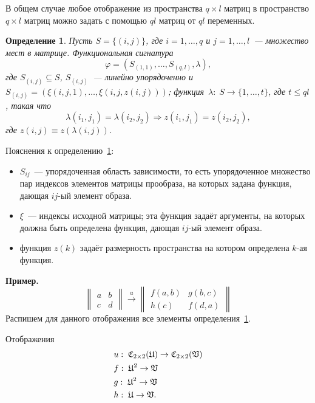 \documentclass[a4paper, 12pt]{report}
\newtheorem{definition}{Определение}[chapter]
\begin{document}
В общем случае любое отображение из пространства $q\times l$ матриц в пространство $q\times l$ матриц можно задать с помощью $ql$ матриц от $ql$ переменных.

\begin{definition}
\label{def::sign}
Пусть $S = \{ (i, j) \}$, где $i = 1,\ldots, q$ и $j = 1,\ldots, l$~--- множество мест в матрице. Функциональная сигнатура
\[
\varphi = (S_{(1,1)}, \ldots, S_{(q, l)}, \lambda),
\]
где $S_{(i, j)} \subseteq S$, $S_{(i,j)}$~--- линейно упорядоченно и $S_{(i,j)} = (\xi(i, j, 1), \ldots, \xi(i, j, z(i, j)))$; функция~$\lambda: \;S \rightarrow \{1, \ldots, t\}$, где $t \leq ql$, такая что
\[
\lambda(i_1, j_1) = \lambda(i_2, j_2) \Rightarrow z(i_1, j_1) = z(i_2, j_2),
\]
где $z(i, j) \equiv z(\lambda(i, j))$.
\end{definition}
Пояснения к определению~\ref{def::sign}:
\begin{itemize}
\item $S_{ij}$~--- упорядоченная область зависимости, то есть упорядоченное множество пар индексов элементов матрицы прообраза, на которых задана функция, дающая $ij$-ый элемент образа.
\item $\xi$~--- индексы исходной матрицы; эта функция задаёт аргументы, на которых должна быть определена функция, дающая $ij$-ый элемент образа.
\item функция $z(k)$ задаёт размерность пространства на котором определена $k$-ая функция.
\end{itemize}
\textbf{Пример.}
\[
\begin{Vmatrix}
a & b\\
c & d
\end{Vmatrix}
\mathop{\longrightarrow}\limits^u
\begin{Vmatrix}
f(a, b) & g(b, c)\\
h(c) & f(d, a)
\end{Vmatrix}
\]
Распишем для данного отображения все элементы определения~\ref{def::sign}.

Отображения
\begin{equation*}
\begin{split}
& u:\; \mathfrak{C}_{2 \times 2}(\mathfrak{U}) \rightarrow \mathfrak{C}_{2 \times 2}(\mathfrak{V}) \\
& f: \; \mathfrak{U}^2 \rightarrow \mathfrak{V} \\
& g: \; \mathfrak{U}^2 \rightarrow \mathfrak{V} \\
& h: \; \mathfrak{U} \rightarrow \mathfrak{V}.
\end{split}
\end{equation*}
\end{document}
